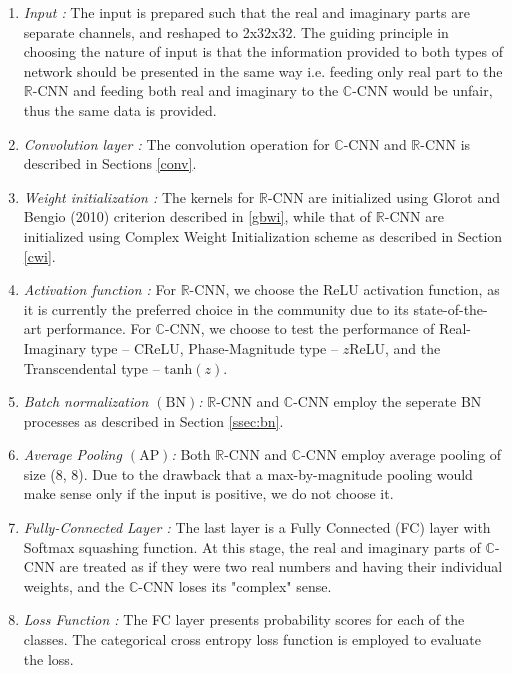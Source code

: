  


\begin{enumerate}
	\item \textit{Input :} The input is prepared such that the real and imaginary parts are separate channels, and reshaped to 2x32x32. The guiding principle in choosing the nature of input is that the information provided to both types of network should be presented in the same way i.e. feeding only real part to the $\mathbb{R}$-CNN and feeding both real and imaginary to the $\mathbb{C}$-CNN would be unfair, thus the same data is provided. 
	\item \textit{Convolution layer :} The convolution operation for $\mathbb{C}$-CNN and $\mathbb{R}$-CNN is described in Sections \ref{conv}.
	\item \textit{Weight initialization :} The kernels for $\mathbb{R}$-CNN are initialized using Glorot and Bengio (2010) criterion \cite{glorot2010understanding} described in \ref{gbwi}, while that of $\mathbb{R}$-CNN are initialized using Complex Weight Initialization scheme \cite{trabelsi2018deep} as described in Section \ref{cwi}.
	
	\item \textit{Activation function :} For $\mathbb{R}$-CNN, we choose the ReLU activation function, as it is currently the preferred choice in the community due to its state-of-the-art performance. For $\mathbb{C}$-CNN, we choose to test the performance of Real-Imaginary type -- $\mathrm{C}$ReLU, Phase-Magnitude type --  $z$ReLU, and the Transcendental type -- $\mathrm{tanh}(z)$.
	
	\item \textit{Batch normalization $(\mathrm{BN})$:} $\mathbb{R}$-CNN and $\mathbb{C}$-CNN employ the seperate BN processes as described in Section \ref{ssec:bn}.
	
	\item \textit{Average Pooling $(\mathrm{AP})$:} Both $\mathbb{R}$-CNN and $\mathbb{C}$-CNN employ average pooling of size (8,  8). Due to the drawback that a max-by-magnitude pooling would make sense only if the input is positive, we do not choose it. 
	
	\item \textit{Fully-Connected Layer :}  The last layer is a Fully Connected (FC) layer with Softmax squashing function. At this stage, the real and imaginary parts of $\mathbb{C}$-CNN are treated as if they were two real numbers and having their individual weights, and the $\mathbb{C}$-CNN loses its "complex" sense.
	
	\item \textit{Loss Function :} The FC layer presents probability scores for each of the classes. The categorical cross entropy loss function is employed to evaluate the loss.
\end{enumerate}



